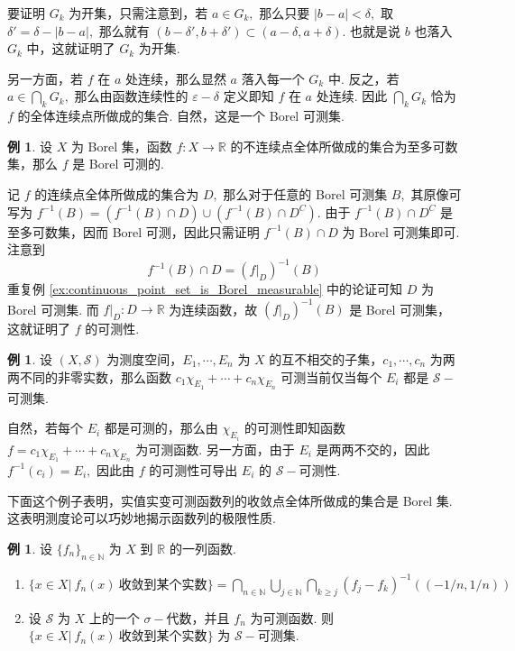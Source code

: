 \documentclass[12pt, a4paper, oneside]{book}
\numberwithin{figure}{section}
\theoremstyle{definition}
\newtheorem{example}[theorem]{例}
\begin{document}
要证明 $G_k$ 为开集，只需注意到，若 $a\in G_k,$ 那么只要 $|b-a|<\delta,$ 取 $\delta'=\delta-|b-a|,$ 那么就有 
$(b-\delta',b+\delta')\subset (a-\delta,a+\delta).$ 也就是说 $b$ 也落入 $G_k$ 中，这就证明了 $G_k$ 为开集. 

另一方面，若 $f$ 在 $a$ 处连续，那么显然 $a$ 落入每一个 $G_k$ 中. 反之，若 $a\in\bigcap_k G_k,$ 那么由函数连续性的 $\varepsilon-\delta$ 定义即知 $f$ 在 $a$ 处连续. 
因此 $\bigcap_k G_k$ 恰为 $f$ 的全体连续点所做成的集合. 自然，这是一个 Borel 可测集.

\begin{example}
    设 $X$ 为 Borel 集，函数 $f:X\to\mathbb R$ 的不连续点全体所做成的集合为至多可数集，那么 $f$ 是 Borel 可测的.
\end{example}

记 $f$ 的连续点全体所做成的集合为 $D,$ 那么对于任意的 Borel 可测集 $B,$ 其原像可写为
$f^{-1}(B)=(f^{-1}(B)\cap D)\cup (f^{-1}(B)\cap D^C).$ 由于 $f^{-1}(B)\cap D^C$ 是至多可数集，因而 Borel 可测，因此只需证明 $f^{-1}(B)\cap D$ 为 Borel 可测集即可. 注意到
\begin{equation}
    f^{-1}(B)\cap D=(f|_D)^{-1}(B)
\end{equation}
重复例 \ref{ex:continuous_point_set_is_Borel_measurable} 中的论证可知 $D$ 为 Borel 可测集.
而 $f|_D:D\to\mathbb R$ 为连续函数，故 $(f|_D)^{-1}(B)$ 是 Borel 可测集，这就证明了 $f$ 的可测性.


\begin{example}
    设 $(X,\mathcal S)$ 为测度空间，$E_1,\cdots,E_n$ 为 $X$ 的互不相交的子集，$c_1,\cdots,c_n$ 为两两不同的非零实数，那么函数 $c_1\chi_{E_1}+\cdots+c_n\chi_{E_n}$ 可测当前仅当每个 $E_i$ 都是 $\mathcal S-$可测集.
\end{example}

自然，若每个 $E_i$ 都是可测的，那么由 $\chi_{E_i}$ 的可测性即知函数 $f=c_1\chi_{E_1}+\cdots+c_n\chi_{E_n}$ 为可测函数. 
另一方面，由于 $E_i$ 是两两不交的，因此 $f^{-1}(c_i)=E_i,$ 因此由 $f$ 的可测性可导出 $E_i$ 的 $\mathcal S-$可测性.

下面这个例子表明，实值实变可测函数列的收敛点全体所做成的集合是 Borel 集. 这表明测度论可以巧妙地揭示函数列的极限性质.
\begin{example}
    设 $\{f_n\}_{n\in\mathbb N}$ 为 $X$ 到 $\mathbb R$ 的一列函数. 
    \begin{enumerate}[label=\alph*)]
        \item $\{x\in X|\ f_n(x)\ \text{收敛到某个实数}\}=\bigcap_{n\in\mathbb N}\bigcup_{j\in\mathbb N}\bigcap_{k\geq j} (f_j-f_k)^{-1}((-1/n,1/n))$
        \item 设 $\mathcal S$ 为 $X$ 上的一个 $\sigma-$代数，并且 $f_n$ 为可测函数. 则 $\{x\in X|\ f_n(x)\ \text{收敛到某个实数}\}$ 为 $\mathcal S-$可测集.
    \end{enumerate}
\end{example}
\end{document}
